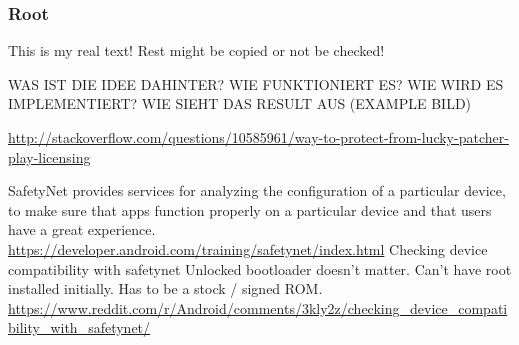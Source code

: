 \subsubsection{Root} \label{subsubsection:counter-improve-tampering-root}
This is my real text! Rest might be copied or not be checked!



WAS IST DIE IDEE DAHINTER? WIE FUNKTIONIERT ES? WIE WIRD ES IMPLEMENTIERT? WIE SIEHT DAS RESULT AUS (EXAMPLE BILD)\newline

\url{http://stackoverflow.com/questions/10585961/way-to-protect-from-lucky-patcher-play-licensing}\newline






SafetyNet provides services for analyzing the configuration of a particular device, to make sure that apps function properly on a particular device and that users have a great experience. \url{https://developer.android.com/training/safetynet/index.html} Checking device compatibility with safetynet\newline
Unlocked bootloader doesn't matter.
Can't have root installed initially.
Has to be a stock / signed ROM.
\url{https://www.reddit.com/r/Android/comments/3kly2z/checking_device_compatibility_with_safetynet/}
